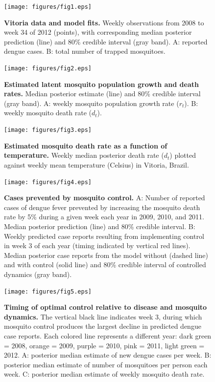 \documentclass[10pt,letterpaper]{article}
\begin{document}
\begin{figure}[!h]
\texttt{[image: figures/fig1.eps]}
\caption{{\bf Vitoria data and model fits.}
Weekly observations from 2008 to week 34 of 2012 (points), with corresponding median posterior prediction (line) and 80\% credible interval (gray band). A: reported dengue cases. B: total number of trapped mosquitoes.
}
\label{timeseries}
\end{figure}

\begin{figure}[!h]
\texttt{[image: figures/fig2.eps]}
\caption{{\bf Estimated latent mosquito population growth and death rates.}
Median posterior estimate (line) and 80\% credible interval (gray band).  A: weekly mosquito population growth rate ($r_t$). B: weekly mosquito death rate ($d_t$).
}
\label{latent}
\end{figure}

\begin{figure}[!h]
\texttt{[image: figures/fig3.eps]}
\caption{{\bf Estimated mosquito death rate as a function of temperature.}
Weekly median posterior death rate ($d_t$) plotted against weekly mean temperature (Celsius) in Vitoria, Brazil.
}
\label{temp}
\end{figure}

\begin{figure}[!h]
\texttt{[image: figures/fig4.eps]}
\caption{{\bf Cases prevented by mosquito control.}
A: Number of reported cases of dengue fever prevented by increasing the mosquito death rate by 5\% during a given week each year in 2009, 2010, and 2011. Median posterior prediction (line) and 80\% credible interval. B: Weekly predicted case reports resulting from implementing control in week 3 of each year (timing indicated by vertical red lines).  Median posterior case reports from the model without (dashed line) and with control (solid line) and 80\% credible interval of controlled dynamics (gray band).
}
\label{control}
\end{figure}

\begin{figure}[!h]
\texttt{[image: figures/fig5.eps]}
\caption{{\bf Timing of optimal control relative to disease and mosquito dynamics.}
The vertical black line indicates week 3, during which mosquito control produces the largest decline in predicted dengue case reports. Each colored line represents a different year: dark green = 2008, orange = 2009, purple = 2010, pink = 2011, light green = 2012. A: posterior median estimate of new dengue cases per week. B: posterior median estimate of number of mosquitoes per person each week. C: posterior median estimate of weekly mosquito death rate.
}
\label{timing}
\end{figure}
\end{document}
